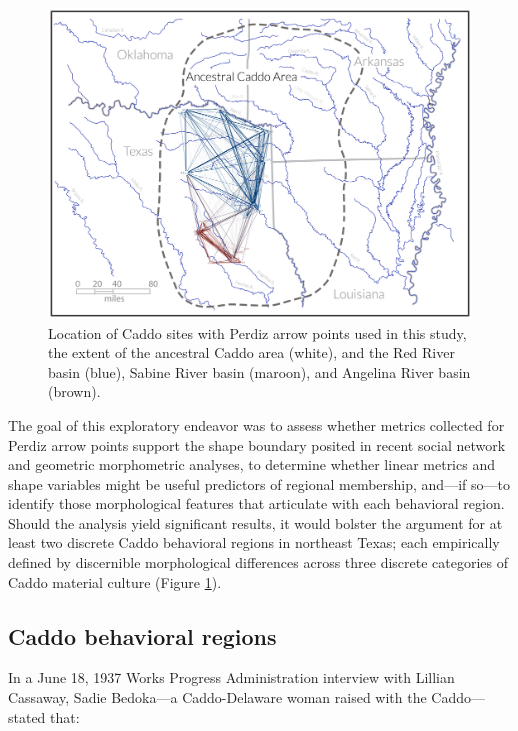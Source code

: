 \documentclass[smallextended]{svjour3}       %
\begin{document}
\begin{figure}
\includegraphics[width=1\linewidth]{ms-figs/figure1} \caption{Location of Caddo sites with Perdiz arrow points used in this study, the extent of the ancestral Caddo area (white), and the Red River basin (blue), Sabine River basin (maroon), and Angelina River basin (brown).}\label{fig:fig1}
\end{figure}

The goal of this exploratory endeavor was to assess whether metrics
collected for Perdiz arrow points support the shape boundary posited in
recent social network and geometric morphometric analyses, to determine
whether linear metrics and shape variables might be useful predictors of
regional membership, and---if so---to identify those morphological
features that articulate with each behavioral region. Should the
analysis yield significant results, it would bolster the argument for at
least two discrete Caddo behavioral regions in northeast Texas; each
empirically defined by discernible morphological differences across
three discrete categories of Caddo material culture (Figure
\ref{fig:fig1}).

\hypertarget{caddo-behavioral-regions}{%
\subsection{Caddo behavioral regions}\label{caddo-behavioral-regions}}

In a June 18, 1937 Works Progress Administration interview with Lillian
Cassaway, Sadie Bedoka---a Caddo-Delaware woman raised with the
Caddo---stated that:
\end{document}

